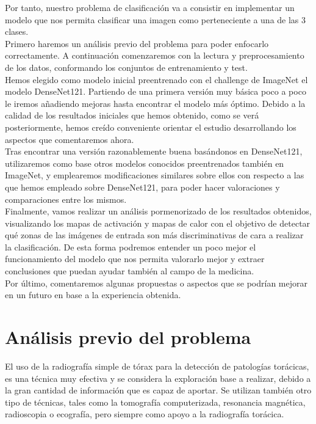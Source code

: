 \documentclass[11pt,a4paper]{article}
\theoremstyle{definition}
\begin{document}
Por tanto, nuestro problema de clasificación va a consistir en implementar un modelo que nos permita clasificar una imagen como perteneciente a una de las 3 clases.\\

Primero haremos un análisis previo del problema para poder enfocarlo correctamente. A continuación comenzaremos con la lectura y preprocesamiento de los datos, conformando los conjuntos de entrenamiento y test.\\

Hemos elegido como modelo inicial preentrenado con el challenge de ImageNet el modelo DenseNet121. Partiendo de una primera versión muy básica poco a poco le iremos añadiendo mejoras hasta encontrar el modelo más óptimo. Debido a la calidad de los resultados iniciales que hemos obtenido, como se verá posteriormente,  hemos creído conveniente orientar el estudio desarrollando los aspectos que comentaremos ahora.\\

Tras encontrar una versión razonablemente buena basándonos en DenseNet121,  utilizaremos como base otros modelos conocidos preentrenados también en ImageNet, y emplearemos modificaciones similares sobre ellos con respecto a las que hemos empleado sobre DenseNet121, para poder hacer valoraciones y comparaciones entre los mismos.\\

Finalmente, vamos realizar un análisis pormenorizado de los resultados obtenidos, visualizando los mapas de activación y mapas de calor con el objetivo de detectar qué zonas de las imágenes de entrada son más discriminativas de cara a realizar la clasificación. De esta forma podremos entender un poco mejor el funcionamiento del modelo que nos permita valorarlo mejor y extraer conclusiones que puedan ayudar también al campo de la medicina.\\

Por último, comentaremos algunas propuestas o aspectos que se podrían mejorar en un futuro en base a la experiencia obtenida.\\

\newpage

\section{Análisis previo del problema}

El uso de la radiografía simple de tórax para la detección de patologías torácicas,  es una técnica muy efectiva y se considera la exploración base a realizar, debido a la gran cantidad de información que es capaz de aportar.  Se utilizan también otro tipo de técnicas,  tales como la tomografía computerizada,  resonancia magnética, radioscopia o ecografía, pero siempre como apoyo a la radiografía torácica.\\
\end{document}
